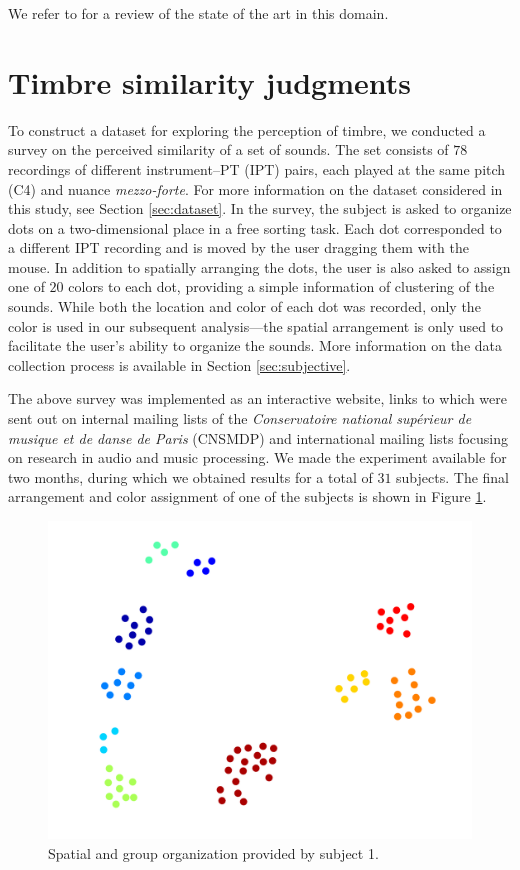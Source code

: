 \documentclass{bmcart}
\begin{document}
We refer to \cite{bellet2015book} for a review of the state of the art in this domain.


\section*{Timbre similarity judgments}
\label{sec:survey}

To construct a dataset for exploring the perception of timbre, we conducted a survey on the perceived similarity of a set of sounds.
The set consists of $78$ recordings of different instrument--PT (IPT) pairs, each played at the same pitch (C4) and nuance \textit{mezzo-forte}. For more information on the dataset considered in this study, see Section \ref{sec:dataset}.
In the survey, the subject is asked to organize dots on a two-dimensional place in a free sorting task.
Each dot corresponded to a different IPT recording and is moved by the user dragging them with the mouse.
In addition to spatially arranging the dots, the user is also asked to assign one of $20$ colors to each dot, providing a simple information of clustering of the sounds.
While both the location and color of each dot was recorded, only the color is used in our subsequent analysis---the spatial arrangement is only used to facilitate the user's ability to organize the sounds.
More information on the data collection process is available in  Section \ref{sec:subjective}.

The above survey was implemented as an interactive website, links to which were sent out on internal mailing lists of the \emph{Conservatoire national sup\'erieur de musique et de danse de Paris} (CNSMDP) and international mailing lists focusing on research in audio and music processing.
We made the experiment available for two months, during which we obtained results for a total of $31$ subjects.
The final arrangement and color assignment of one of the subjects is shown in Figure \ref{fig:xp2display}.

\begin{figure}
\center
\includegraphics[width = \textwidth]{figures/xp2example1.png}
\caption{Spatial and group organization provided by subject 1.}
\label{fig:xp2display}
\end{figure}
\end{document}
